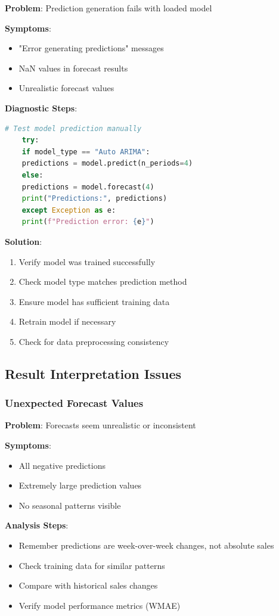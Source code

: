 \textbf{Problem}: Prediction generation fails with loaded model

\textbf{Symptoms}:
\begin{itemize}
	\item "Error generating predictions" messages
	\item NaN values in forecast results
	\item Unrealistic forecast values
\end{itemize}

\textbf{Diagnostic Steps}:
\begin{lstlisting}[language=python,basicstyle=\color{blue}]
	# Test model prediction manually
	try:
	if model_type == "Auto ARIMA":
	predictions = model.predict(n_periods=4)
	else:
	predictions = model.forecast(4)
	print("Predictions:", predictions)
	except Exception as e:
	print(f"Prediction error: {e}")
\end{lstlisting}

\textbf{Solution}:
\begin{enumerate}
	\item Verify model was trained successfully
	\item Check model type matches prediction method
	\item Ensure model has sufficient training data
	\item Retrain model if necessary
	\item Check for data preprocessing consistency
\end{enumerate}

\subsection{Result Interpretation Issues}

\subsubsection{Unexpected Forecast Values}

\textbf{Problem}: Forecasts seem unrealistic or inconsistent

\textbf{Symptoms}:
\begin{itemize}
	\item All negative predictions
	\item Extremely large prediction values
	\item No seasonal patterns visible
\end{itemize}

\textbf{Analysis Steps}:
\begin{itemize}
	\item Remember predictions are week-over-week changes, not absolute sales
	\item Check training data for similar patterns
	\item Compare with historical sales changes
	\item Verify model performance metrics (WMAE)
\end{itemize}

